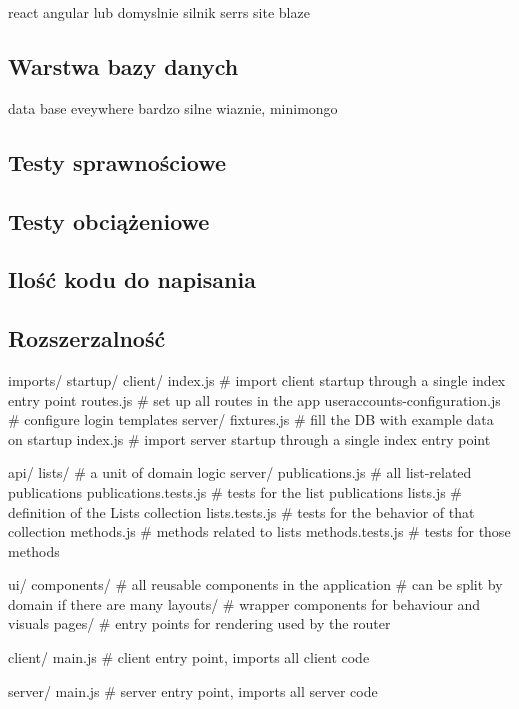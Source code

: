 \documentclass[12pt]{report}
\begin{document}
      react angular lub domyslnie silnik serrs site blaze
    \subsection{Warstwa bazy danych}
      data base eveywhere bardzo silne wiaznie, minimongo
    \subsection{Testy sprawnościowe}
    \subsection{Testy obciążeniowe}
    \subsection{Ilość kodu do napisania}
    \subsection{Rozszerzalność}
imports/
  startup/
    client/
      index.js                 # import client startup through a single index entry point
      routes.js                # set up all routes in the app
      useraccounts-configuration.js # configure login templates
    server/
      fixtures.js              # fill the DB with example data on startup
      index.js                 # import server startup through a single index entry point

  api/
    lists/                     # a unit of domain logic
      server/
        publications.js        # all list-related publications
        publications.tests.js  # tests for the list publications
      lists.js                 # definition of the Lists collection
      lists.tests.js           # tests for the behavior of that collection
      methods.js               # methods related to lists
      methods.tests.js         # tests for those methods

  ui/
    components/                # all reusable components in the application
                               # can be split by domain if there are many
    layouts/                   # wrapper components for behaviour and visuals
    pages/                     # entry points for rendering used by the router

client/
  main.js                      # client entry point, imports all client code

server/
  main.js                      # server entry point, imports all server code
\end{document}
